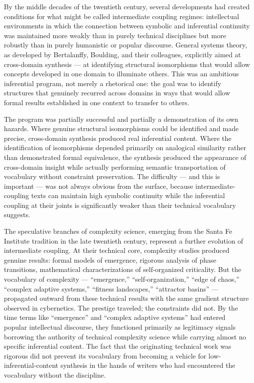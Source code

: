\documentclass[12pt, openright, twoside]{book}
\begin{document}
By the middle decades of the twentieth century, several developments had
created conditions for what might be called intermediate coupling regimes:
intellectual environments in which the connection between symbolic and
inferential continuity was maintained more weakly than in purely technical
disciplines but more robustly than in purely humanistic or popular discourse.
General systems theory, as developed by Bertalanffy, Boulding, and their
colleagues, explicitly aimed at cross-domain synthesis --- at identifying
structural isomorphisms that would allow concepts developed in one domain
to illuminate others. This was an ambitious inferential program, not merely
a rhetorical one: the goal was to identify structures that genuinely recurred
across domains in ways that would allow formal results established in one
context to transfer to others.

The program was partially successful and partially a demonstration of its own
hazards. Where genuine structural isomorphisms could be identified and made
precise, cross-domain synthesis produced real inferential content. Where the
identification of isomorphisms depended primarily on analogical similarity
rather than demonstrated formal equivalence, the synthesis produced the
appearance of cross-domain insight while actually performing semantic
transportation of vocabulary without constraint preservation. The difficulty
--- and this is important --- was not always obvious from the surface, because
intermediate-coupling texts can maintain high symbolic continuity while the
inferential coupling at their joints is significantly weaker than their
technical vocabulary suggests.

The speculative branches of complexity science, emerging from the Santa Fe
Institute tradition in the late twentieth century, represent a further
evolution of intermediate coupling. At their technical core, complexity
studies produced genuine results: formal models of emergence, rigorous
analysis of phase transitions, mathematical characterizations of self-organized
criticality. But the vocabulary of complexity --- ``emergence,'' ``self-organization,''
``edge of chaos,'' ``complex adaptive systems,'' ``fitness landscapes,''
``attractor basins'' --- propagated outward from these technical results with
the same gradient structure observed in cybernetics. The prestige traveled;
the constraints did not. By the time terms like ``emergence'' and ``complex
adaptive systems'' had entered popular intellectual discourse, they functioned
primarily as legitimacy signals borrowing the authority of technical complexity
science while carrying almost no specific inferential content. The fact that
the originating technical work was rigorous did not prevent its vocabulary
from becoming a vehicle for low-inferential-content synthesis in the hands
of writers who had encountered the vocabulary without the discipline.
\end{document}
